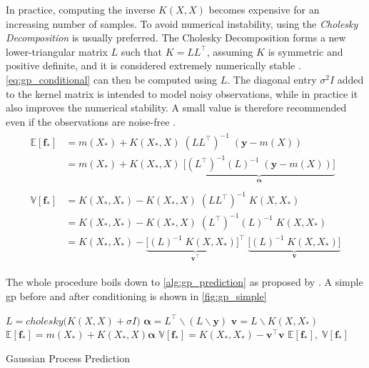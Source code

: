 In practice, computing the inverse $K(X, X)$ becomes expensive for an increasing number of samples. To avoid numerical instability, using the \textit{Cholesky Decomposition} is usually preferred. The Cholesky Decomposition forms a new lower-triangular matrix $L$ such that $K = L L^\intercal$, assuming $K$ is symmetric and positive definite, and it is considered extremely numerically stable \cite{rasmussen}. \cref{eq:gp_conditional} can then be computed using $L$. The diagonal entry $\sigma^2 I$ added to the kernel matrix is intended to model noisy observations, while in practice it also improves the numerical stability. A small value is therefore recommended even if the observations are noise-free \cite{scikit-learn}.
\begin{subequations}
\begin{align}
    \begin{split}
    \mathbb{E}[{\boldsymbol{f}}_*] &= m(X_*) + K(X_*, X) \; (L L^\intercal)^{-1} \; (\boldsymbol{y} - m(X))\\ &= m(X_*) + K(X_*, X) \; \underbrace{\big[(L^\intercal)^{-1} (L)^{-1}  \; (\boldsymbol{y} - m(X))\big]}_{\boldsymbol{\alpha}}
    \end{split}\\
    \begin{split}
    \mathbb{V}[\boldsymbol{f}_*] &= K(X_*, X_*) - K(X_*, X) \; (L L^\intercal)^{-1} \; K(X, X_*)\\
    &= K(X_*, X_*) - K(X_*, X) \; (L^\intercal)^{-1} (L)^{-1} \; K(X, X_*)\\
    &= K(X_*, X_*) - \underbrace{\big[(L)^{-1} \; K(X, X_*)\big]^\intercal}_{\boldsymbol{v^\intercal}} \; \underbrace{\big[(L)^{-1} \; K(X, X_*)\big]}_{\boldsymbol{v}}
    \end{split}
\end{align}
\end{subequations}

The whole procedure boils down to \cref{alg:gp_prediction} as proposed by \cite{rasmussen}. A simple \acrshort{gp} before and after conditioning is shown in \cref{fig:gp_simple}

\begin{algorithm}[H]
\begin{algorithmic}[1]
    \State $L = cholesky\big(K(X, X) + \sigma I\big)$
    \State $\boldsymbol{\alpha} = L^\intercal \backslash (L \backslash \boldsymbol{y})$
    \State $\boldsymbol{v} = L \backslash K(X, X_*)$
    \State $\mathbb{E}[\boldsymbol{f}_*] = m(X_*) + K(X_*, X) \boldsymbol{\alpha}$
    \State $\mathbb{V}[\boldsymbol{f}_*] = K(X_*, X_*) - \boldsymbol{v}^\intercal \boldsymbol{v}$
    \State \Return $\mathbb{E}[\boldsymbol{f}_*], \; \mathbb{V}[\boldsymbol{f}_*]$
\EndProcedure
\end{algorithmic}
\caption{Gaussian Process Prediction}
\label{alg:gp_prediction}
\end{algorithm}

